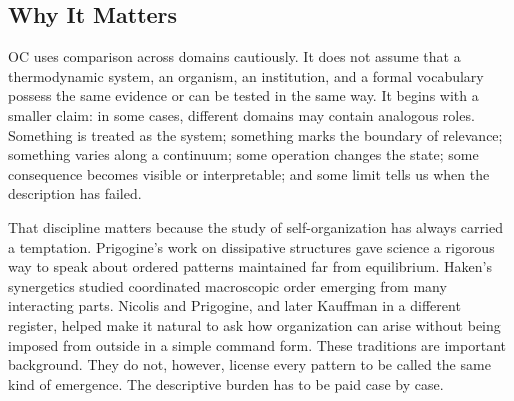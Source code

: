 \documentclass[11pt,a4paper,openany]{book}
\begin{document}
\subsection{Why It Matters}
OC uses comparison across domains cautiously. It does not assume that a thermodynamic system, an organism, an institution, and a formal vocabulary possess the same evidence or can be tested in the same way. It begins with a smaller claim: in some cases, different domains may contain analogous roles. Something is treated as the system; something marks the boundary of relevance; something varies along a continuum; some operation changes the state; some consequence becomes visible or interpretable; and some limit tells us when the description has failed. \cite{prigogine_dissipative,haken_synergetics}\par
That discipline matters because the study of self-organization has always carried a temptation. Prigogine's work on dissipative structures gave science a rigorous way to speak about ordered patterns maintained far from equilibrium. Haken's synergetics studied coordinated macroscopic order emerging from many interacting parts. Nicolis and Prigogine, and later Kauffman in a different register, helped make it natural to ask how organization can arise without being imposed from outside in a simple command form. These traditions are important background. They do not, however, license every pattern to be called the same kind of emergence. The descriptive burden has to be paid case by case.\par
\end{document}

